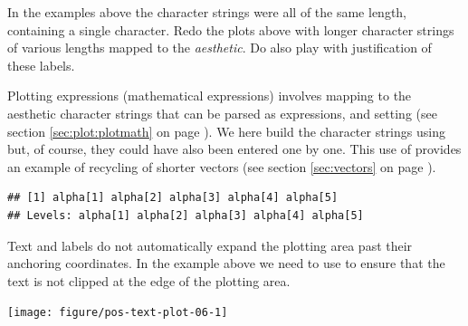 \documentclass[krantz2]{krantz}\usepackage{knitr}%
\begin{document}
\begin{playground}
In the examples above the character strings were all of the same length, containing a single character. Redo the plots above with longer character strings of various lengths mapped to the  \emph{aesthetic}. Do also play with justification of these labels.
\end{playground}

Plotting expressions (mathematical expressions) involves mapping to the  aesthetic character strings that can be parsed as expressions, and setting  (see section \ref{sec:plot:plotmath} on page \pageref{sec:plot:plotmath}). We here build the character strings using  but, of course, they could have also been entered one by one. This use of  provides an example of recycling of shorter vectors (see section \ref{sec:vectors} on page \pageref{sec:vectors}).

\begin{knitrout}\footnotesize
{}\color{fgcolor}\begin{kframe}
\begin{alltt}
 \hlkwb{<-}
  \hlstd{(} \hlstd{=} \hlopt{:}\hlstd{,}  \hlstd{=} \hlstd{(}\hlstd{,} \hlstd{),}  \hlstd{=} \hlstd{(}\hlstr{"alpha["}\hlstd{,} \hlopt{:}\hlstd{,} \hlstr{"]"}\hlstd{,}  \hlstd{=} \hlstd{))}
\hlopt{$}
\end{alltt}
\begin{verbatim}
## [1] alpha[1] alpha[2] alpha[3] alpha[4] alpha[5]
## Levels: alpha[1] alpha[2] alpha[3] alpha[4] alpha[5]
\end{verbatim}
\end{kframe}
\end{knitrout}

Text and labels do not automatically expand the plotting area past their anchoring coordinates. In the example above we need to use  to ensure that the text is not clipped at the edge of the plotting area.

\begin{knitrout}\footnotesize
{}\color{fgcolor}\begin{kframe}
\begin{alltt}
    \hlopt{+}
  \hlstd{(} \hlstd{=} \hlopt{-}\hlstd{,}  \hlstd{=} \hlstd{,}  \hlstd{=} \hlstd{)} \hlopt{+}
  \hlstd{()} \hlopt{+}
  \hlstd{(} \hlstd{=} \hlstd{)}
\end{alltt}
\end{kframe}

{\centering \texttt{[image: figure/pos-text-plot-06-1]} 

}



\end{knitrout}
\end{document}
